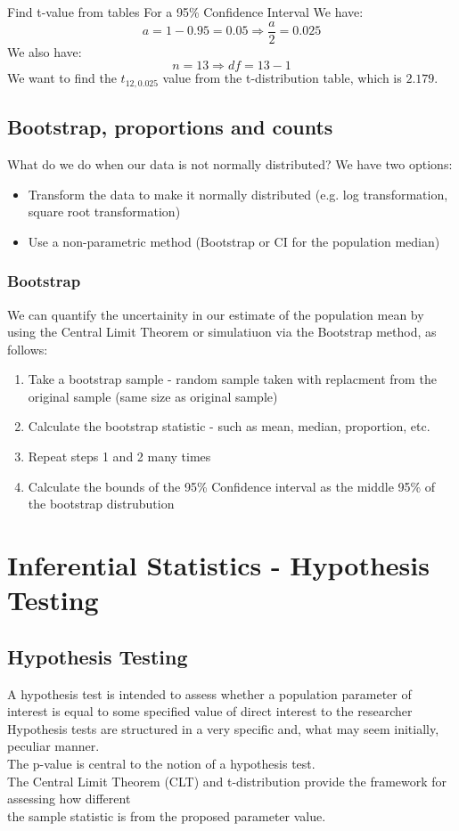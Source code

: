 \documentclass[a4paper, 10pt]{article}
\begin{document}
\begin{examplebox}{Find t-value from tables For a 95\% Confidence Interval}{}
    We have:
    $$a = 1 - 0.95 = 0.05 \Rightarrow \frac{a}{2} = 0.025$$
    We also have:
    $$n = 13 \Rightarrow df = 13 - 1$$
    We want to find the $t_{12, 0.025}$ value from the t-distribution table, which is $2.179$.
\end{examplebox}


\subsection{Bootstrap, proportions and counts}
What do we do when our data is not normally distributed? We have two options:
\begin{itemize}
    \item Transform the data to make it normally distributed (e.g. log transformation, square root transformation)
    \item Use a non-parametric method (Bootstrap or CI for the population median)
\end{itemize}


\subsubsection{Bootstrap}
We can quantify the uncertainity in our estimate of the population mean by using the Central Limit Theorem or simulatiuon via the Bootstrap method, as follows:
\begin{enumerate}
    \item Take a bootstrap  sample - random sample taken with replacment from the original sample (same size as original sample)
    \item Calculate the bootstrap statistic - such as mean, median, proportion, etc.
    \item Repeat steps 1 and 2 many times
    \item Calculate the bounds of the 95\% Confidence interval as the middle 95\% of the bootstrap distrubution
\end{enumerate}


\section{Inferential Statistics - Hypothesis Testing}
\subsection{Hypothesis Testing}
A hypothesis test is intended to assess whether a population parameter of interest is equal to some
specified value of direct interest to the researcher \\
Hypothesis tests are structured in a very specific and, what may seem initially, peculiar manner. \\
The p-value is central to the notion of a hypothesis test. \\
The Central Limit Theorem (CLT) and t-distribution provide the framework for assessing how different \\
the sample statistic is from the proposed parameter value.
\end{document}
